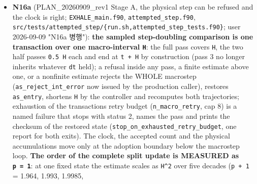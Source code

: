 \documentclass[english,a4paper]{my_memo}
\begin{document}
\begin{itemize}
  at the individual ceilings; outer-shell chord 11.83; "defects reproduced,
  not repaired"), the harness itself untouched. \textbf{N17}: \texttt{ISSUES\_20260909.md}
  corrected per rev 1 section 3 (seed retention no longer stated as an
  eigenvalue of one; B5f marked a withdrawn, uncertified reference; 3.5
  scoped to the present fixed-point map; the restart row now states the
  \texttt{heh\_dev\ \textgreater{}\ 1e-6} branch and the 8.83e-5 discrepancy; \texttt{carrier\_headroom\_known}
  noted; \texttt{hydro\_row\_max} and \texttt{use\_tr} bullets; the \texttt{\_adv} statement in
  section 5 made conditional; new section 3.8 on the physical step never
  being refused for its integration error). \texttt{code\_status\_20260905.md}: the
  Huang et al. 2023 shell-opacity note added to the photoionization row;
  four pre-existing spelling/forbidden-phrase slips fixed on the way
  (\texttt{per-cent} to \texttt{percent} twice, two \texttt{per-molecule} phrases reworded).
  Verification: forbidden-word scans of the four documents; the reproducer\textquotesingle s
  \texttt{run.sh} resolves its default binary path; nothing built or rerun.
\item
  \textbf{N16a} (PLAN\_20260909\_rev1 Stage A, the physical step can be refused
  and the clock is right; \texttt{EXHALE\_main.f90}, \texttt{attempted\_step.f90},
  \texttt{src/tests/attempted\_step/\{run.sh,attempted\_step\_tests.f90\}}; user
  2026-09-09 "N16a 병행"): \textbf{the sampled step-doubling comparison is one
  transaction over one macro-interval \texttt{H}}: the full pass covers \texttt{H}, the
  two half passes \texttt{0.5\ H} each and end at \texttt{t\ +\ H} by construction (pass 3
  no longer inherits whatever \texttt{dt} held); a refusal inside any pass, a
  finite estimate above one, or a nonfinite estimate rejects the WHOLE
  macrostep (\texttt{as\_reject\_int\_error} now issued by the production caller),
  restores \texttt{as\_entry}, shortens \texttt{H} by the controller and recomputes both
  trajectories; exhaustion of the transaction\textquotesingle s retry budget
  (\texttt{n\_macro\_retry}, cap 8) is a named failure that stops with status 2,
  names the pass and prints the checksum of the restored state
  (\texttt{stop\_on\_exhausted\_retry\_budget}, one report for both exits). The clock,
  the accepted count and the physical accumulations move only at the
  adoption boundary below the macrostep loop. \textbf{The order of the complete
  split update is MEASURED as \texttt{p\ =\ 1}}: at one fixed state the estimate
  scales as \texttt{H\^{}2} over five decades (\texttt{p\ +\ 1} = 1.964, 1.993, 1.9985,

\end{itemize}
\end{document}
